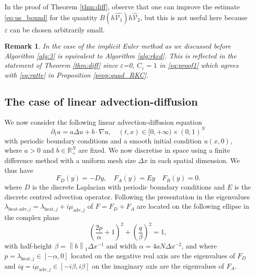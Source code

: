 \documentclass[10pt,a4paper]{article}
\newtheorem{remark}[theorem]{Remark}
\newcommand{\R}{\mathbb{R}}
\renewcommand{\R}{\mathbb{R}}
\newcommand{\norm}[1]{\left\lVert #1 \right\rVert}
\begin{document}
{In the proof of Theorem \ref{thm:diff}, observe that one can improve the estimate \eqref{eq:us_bound} for the quantity $B(h\hat{\mathcal{V}_1})h \hat{\mathcal{V}}_2$}, but this is not useful here because $\varepsilon$ can be chosen arbitrarily small. 
\begin{remark}
In the case of the implicit Euler method as we discussed before Algorithm \ref{alg:3} is equivalent to Algorithm \ref{alg:rkcd}. This is reflected in the statement of Theorem \ref{thm:diff} since $\varepsilon$=0, $C_{\varepsilon}=1$ in \eqref{eq:proof1} which agrees with \eqref{eq:ratte}  in Proposition \ref{prop:quad_RKC}.    
\end{remark}





\subsection{The case of linear  advection-diffusion}

We now consider  the 
following  linear advection-diffusion equation
\begin{equation} \label{eq:advdiffexact}
\partial_t u=a\Delta u+b \cdot \nabla u, \quad (t,x)\in [0,+\infty)\times (0,1)^{N}
\end{equation}
with periodic boundary conditions and a smooth initial condition $u(x,0)$, where $a>0$ and $b\in \R^N_+$ are fixed.  We  now  discretise in space using a finite difference method with a uniform mesh size $\Delta x$ in each spatial dimension.  We thus have 
\begin{equation} \label{eq:adv_diff}
F_{D}(y)= -Dy, \quad F_{A}(y)=E y \quad F_{R}(y)=0.
\end{equation}
where $D$ is the discrete Laplacian with periodic boundary conditions and $E$ is the discrete centred advection operator.
Following the presentation in \cite{Zb11}  the eigenvalues $\lambda_{\text{heat-adv},j}=\lambda_{\text{heat},j}+i\mu_{\text{adv},j}$ of $F=F_D+F_A$ are located  on the following ellipse in the complex plane
\begin{equation} \label{eq:ellipse_pq}
\left(\frac{2p}\alpha+1\right)^2 + \left(\frac{q}\beta\right)^2=1,
\end{equation}
with half-height $\beta=\norm{b}_{1}\Delta x^{-1}$ and width $\alpha=4aN\Delta x^{-2}$, and where
$p=\lambda_{\text{heat},j}\in[-\alpha,0]$ located on the negative real axis are the eigenvalues of $F_D$ and $iq=i\mu_{\text{adv},j}\in[-i\beta,i\beta]$ on the imaginary axis are the eigenvalues of $F_A$.
\end{document}
